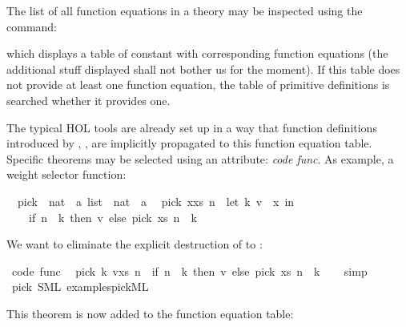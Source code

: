\begin{isabellebody}
\isamarkuptrue%
%
\begin{isamarkuptext}%
The list of all function equations in a theory may be inspected
  using the \isa{{\isasymPRINTCODETHMS}} command:%
\end{isamarkuptext}%
\isamarkuptrue%
\isamarkupfalse%
%
\begin{isamarkuptext}%
\noindent which displays a table of constant with corresponding
  function equations (the additional stuff displayed
  shall not bother us for the moment). If this table does
  not provide at least one function
  equation, the table of primitive definitions is searched
  whether it provides one.

  The typical HOL tools are already set up in a way that
  function definitions introduced by \isa{{\isasymFUN}},
  \isa{{\isasymFUNCTION}}, \isa{{\isasymPRIMREC}}
  \isa{{\isasymRECDEF}} are implicitly propagated
  to this function equation table. Specific theorems may be
  selected using an attribute: \emph{code func}. As example,
  a weight selector function:%
\end{isamarkuptext}%
\isamarkuptrue%
\isamarkupfalse%
\isanewline
\ \ pick\ {\isacharcolon}{\isacharcolon}\ {\isachardoublequoteopen}{\isacharparenleft}nat\ {\isasymtimes}\ {\isacharprime}a{\isacharparenright}\ list\ {\isasymRightarrow}\ nat\ {\isasymRightarrow}\ {\isacharprime}a{\isachardoublequoteclose}\isanewline
\isanewline
{}\isamarkupfalse%
\isanewline
\ \ {\isachardoublequoteopen}pick\ {\isacharparenleft}x{\isacharhash}xs{\isacharparenright}\ n\ {\isacharequal}\ {\isacharparenleft}let\ {\isacharparenleft}k{\isacharcomma}\ v{\isacharparenright}\ {\isacharequal}\ x\ in\isanewline
\ \ \ \ if\ n\ {\isacharless}\ k\ then\ v\ else\ pick\ xs\ {\isacharparenleft}n\ {\isacharminus}\ k{\isacharparenright}{\isacharparenright}{\isachardoublequoteclose}%
\begin{isamarkuptext}%
We want to eliminate the explicit destruction
  of  to :%
\end{isamarkuptext}%
\isamarkuptrue%
\isamarkupfalse%
\ {\isacharbrackleft}code\ func{\isacharbrackright}{\isacharcolon}\isanewline
\ \ {\isachardoublequoteopen}pick\ {\isacharparenleft}{\isacharparenleft}k{\isacharcomma}\ v{\isacharparenright}{\isacharhash}xs{\isacharparenright}\ n\ {\isacharequal}\ {\isacharparenleft}if\ n\ {\isacharless}\ k\ then\ v\ else\ pick\ xs\ {\isacharparenleft}n\ {\isacharminus}\ k{\isacharparenright}{\isacharparenright}{\isachardoublequoteclose}\isanewline
%
\isadelimproof
\ \ %
\endisadelimproof
%
\isatagproof
{}\isamarkupfalse%
\ simp%
\endisatagproof
{\isafoldproof}%
%
\isadelimproof
\isanewline
%
\endisadelimproof
\isanewline
{}\isamarkupfalse%
\ pick\ {\isacharparenleft}SML\ {\isachardoublequoteopen}examples{\isacharslash}pick{}{\isachardot}ML{\isachardoublequoteclose}{\isacharparenright}%
\begin{isamarkuptext}%
This theorem is now added to the function equation table:


\end{isamarkuptext}
\end{isabellebody}
